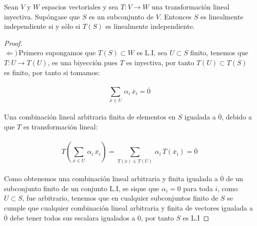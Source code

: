 \documentclass[11pt]{article}
\numberwithin{equation}{section}
\begin{document}
\begin{Problema}{} Sean $V$ y $W$ espacios vectoriales y sea $T: V \to W$ una transformación lineal inyectiva. Supóngase que $S$ es un subconjunto de $V$. 
    Entonces $S$ es linealmente independiente si y sólo si $T(S)$ es linealmente independiente.
\end{Problema}
\begin{proof}
    \,\\
    $\Leftarrow)$\,Primero supongamos que $T(S)\subset W$ es L.I, sea $U\subset S$ finito, tenemos que
    $T:U\rightarrow T(U)$, es una biyecci\'on pues $T$ es inyectiva, por tanto $T(U)\subset T(S)$ es finito, por tanto si tomamos:\,\\
    \,\\
    \begin{equation*}
        \sum_{\overline{x}\in U}\,\alpha_i\,\overline{x}_i=\overline{0}
    \end{equation*}\,\\
    Una combinaci\'on lineal arbitraria finita de elementos en $S$ igualada a $\overline{0}$, debido a que $T$ es transformaci\'on lineal:\,\\
    \,\\
    \begin{equation*}
        T\left(\sum_{\overline{x}\in U}\,\alpha_i\,\overline{x}_i\right)=\sum_{T(\overline{x})\in T(U)}\,\alpha_i\,T(\overline{x}_i)=\overline{0}
    \end{equation*}\,\\
    Como obtenemos una combinaci\'on lineal arbitraria y finita igualada a $\overline{0}$ de un subconjunto finito de un conjunto L.I, se
    sique que $\alpha_i=0$ para toda $i$, como $U\subset S$, fue arbitrario, tenemos que en cualquier subconjuntos
    finito de $S$ se cumple que cualquier combinaci\'on lineal arbitraria y finita de vectores igualada a $\overline{0}$ debe tener 
    todos sus escalara igualados a $0$, por tanto $S$ es L.I
    
\end{proof}
\end{document}
